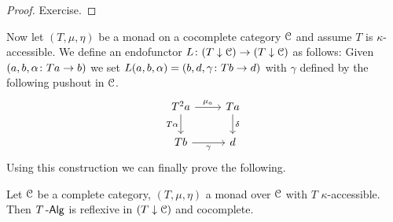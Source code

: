 \documentclass[a4paper,11pt,oneside,openany]{scrbook}
\begin{document}
\begin{proof}
	Exercise.
\end{proof}
Now let $ (T,\mu,\eta) $ be a monad on a cocomplete category $ \operatorname{\mathcal{C}} $ and assume $ T $ is $ \kappa $-accessible.
We define an endofunctor $ L \colon (T\downarrow\operatorname{\mathcal{C}}) \to (T\downarrow\operatorname{\mathcal{C}}) $ as follows:
Given $ (a,b,\alpha\colon Ta \to b) $ we set $ L(a,b,\alpha) = (b,d,\gamma \colon Tb \to d) $ with $ \gamma $ defined by
the following pushout in $ \operatorname{\mathcal{C}} $.
\begin{displaymath}
	\begin{tikzcd}
		T^2 a \arrow[r, "\mu_a"]\arrow[d, "T\alpha"'] &  Ta \arrow[d, "\delta"]\\
		Tb \arrow[r,"\gamma"'] & d
	\end{tikzcd}
\end{displaymath}
Using this construction we can finally prove the following.
\begin{thm}
	Let $\operatorname{\mathcal{C}}$ be a complete category, $(T,\mu,\eta)$ a monad over $\operatorname{\mathcal{C}}$ with $T$ $\kappa$-accessible. Then $T\operatorname{-\mathsf{Alg}}$ is reflexive in $(T\downarrow\operatorname{\mathcal{C}})$ and cocomplete.
\end{thm}
\end{document}
